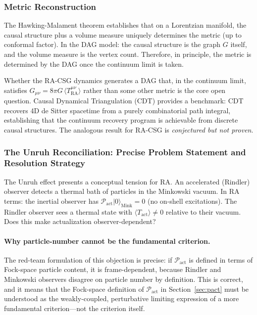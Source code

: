 \documentclass[11pt,a4paper]{article}
\theoremstyle{plain}
\theoremstyle{definition}
\theoremstyle{remark}
\newcommand{\Pact}{\mathcal{P}_{\mathrm{act}}}
\newcommand{\Tact}{T^{\mu\nu}_{\mathrm{RA}}}
\newcommand{\ket}[1]{|#1\rangle}
\begin{document}
\subsubsection{Metric Reconstruction}

The Hawking-Malament theorem establishes that on a Lorentzian manifold, the causal
structure plus a volume measure uniquely determines the metric (up to conformal
factor). In the DAG model: the causal structure is the graph $G$ itself, and the
volume measure is the vertex count. Therefore, in principle, the metric is
determined by the DAG once the continuum limit is taken.

Whether the RA-CSG dynamics generates a DAG that, in the continuum limit, satisfies
$G_{\mu\nu} = 8\pi G\,\langle\Tact\rangle$ rather than some other metric is the
core open question. Causal Dynamical Triangulation (CDT) \citep{Ambjorn2012}
provides a benchmark: CDT recovers 4D de Sitter spacetime from a purely
combinatorial path integral, establishing that the continuum recovery program is
achievable from discrete causal structures. The analogous result for RA-CSG is
\emph{conjectured but not proven}.

\subsubsection{The Unruh Reconciliation: Precise Problem Statement and
Resolution Strategy}

The Unruh effect presents a conceptual tension for RA. An accelerated (Rindler)
observer detects a thermal bath of particles in the Minkowski vacuum. In RA terms:
the inertial observer has $\Pact\ket{0}_{\mathrm{Mink}} = 0$ (no on-shell
excitations). The Rindler observer sees a thermal state with $\langle
T_{\mathrm{act}}\rangle \neq 0$ relative to their vacuum. Does this make
actualization observer-dependent?

\paragraph{Why particle-number cannot be the fundamental criterion.}
The red-team formulation of this objection is precise: if $\Pact$ is defined in
terms of Fock-space particle content, it is frame-dependent, because Rindler and
Minkowski observers disagree on particle number by definition. This is correct,
and it means that the Fock-space definition of $\Pact$ in
Section~\ref{sec:pact} must be understood as the weakly-coupled, perturbative
limiting expression of a more fundamental criterion---not the criterion itself.
\end{document}
